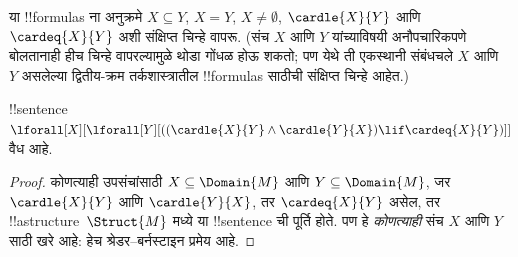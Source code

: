 \documentclass[../../../include/open-logic-section]{subfiles}
\begin{document}
या !!{formula}s ना अनुक्रमे $X \subseteq Y$,
$X = Y$, $X \neq \emptyset$, $\cardle{X}{Y}$
आणि $\cardeq{X}{Y}$ अशी संक्षिप्त चिन्हे वापरू.
(संच $X$ आणि $Y$ यांच्याविषयी अनौपचारिकपणे
बोलतानाही हीच चिन्हे वापरल्यामुळे थोडा गोंधळ होऊ शकतो;
पण येथे ती एकस्थानी संबंधचले $X$ आणि~$Y$
असलेल्या द्वितीय-क्रम तर्कशास्त्रातील !!{formula}s
साठीची संक्षिप्त चिन्हे आहेत.)

\begin{prop}
!!{sentence} $\lforall[X][\lforall[Y][((\cardle{X}{Y} \land
    \cardle{Y}{X}) \lif \cardeq{X}{Y})]]$ वैध आहे.
\end{prop}

\begin{proof}
कोणत्याही उपसंचांसाठी $X \subseteq \Domain{M}$
आणि $Y \subseteq \Domain{M}$, जर
$\cardle{X}{Y}$ आणि $\cardle{Y}{X}$, तर
$\cardeq{X}{Y}$ असेल, तर !!a{structure}~$\Struct{M}$
मध्ये या !!{sentence} ची पूर्ति होते. पण हे
\emph{कोणत्याही} संच $X$ आणि $Y$ साठी खरे आहे:
हेच श्रेडर--बर्नस्टाइन प्रमेय आहे.
\end{proof}
\end{document}
